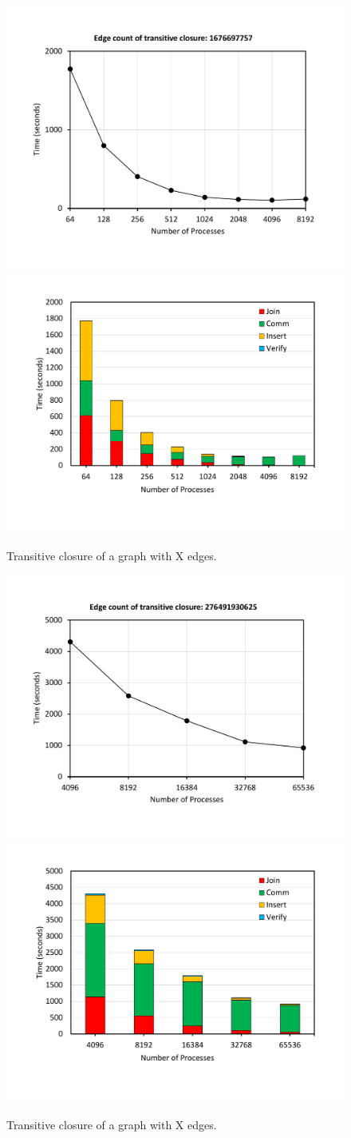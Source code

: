 \begin{figure}[t]
	{\includegraphics[width=.50\textwidth,  trim={0cm 0cm 0cm 0cm, 
			clip}]{results/TC_1_6Billion.pdf}}\hfill%
	{\includegraphics[width=.50\textwidth,  trim={0cm 0cm 0cm 0cm,
			clip}]{results/TC_1_6Billion_breakdown.pdf}}\hfill%
	\centering
	\caption{Transitive closure of a graph with X edges.}
	\label{fig:tc_small}
\end{figure}


\begin{figure}[t]
	{\includegraphics[width=.50\textwidth,  trim={0cm 0cm 0cm 0cm, 
			clip}]{results/TC_260Billion.pdf}}\hfill%
	{\includegraphics[width=.50\textwidth,  trim={0cm 0cm 0cm 0cm,
			clip}]{results/TC_260Billion_breakdown.pdf}}\hfill%
	\centering
	\caption{Transitive closure of a graph with X edges.}
	\label{fig:tc_large}
\end{figure}